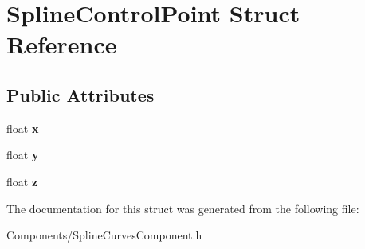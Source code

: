\hypertarget{structSplineControlPoint}{}\section{Spline\+Control\+Point Struct Reference}
\label{structSplineControlPoint}
\subsection*{Public Attributes}
\begin{DoxyCompactItemize}
\item 
\mbox{\label{structSplineControlPoint_a64185bd0ab6da734156c4611385f8086}} 
float {\bfseries x}
\item 
\mbox{\label{structSplineControlPoint_a74787fc26c78adde1e9bbd2eb04486b0}} 
float {\bfseries y}
\item 
\mbox{\label{structSplineControlPoint_a4d5ba75af72c1ea52dd29f433b524148}} 
float {\bfseries z}
\end{DoxyCompactItemize}


The documentation for this struct was generated from the following file\+:\begin{DoxyCompactItemize}
\item 
Components/Spline\+Curves\+Component.\+h\end{DoxyCompactItemize}
